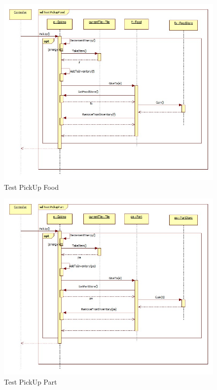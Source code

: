 \begin{figure}[h]
	\begin{center}
		\includegraphics[width=17cm]{chapters/chapter05/diagrams/TestPickUpFood.jpg}
		\caption{Test PickUp Food}
		\label{fig:Test PickUp Food}
	\end{center}
\end{figure}

\begin{figure}[h]
	\begin{center}
		\includegraphics[width=17cm]{chapters/chapter05/diagrams/TestPickUpPart.jpg}
		\caption{Test PickUp Part}
		\label{fig:Test PickUp Part}
	\end{center}
\end{figure}

